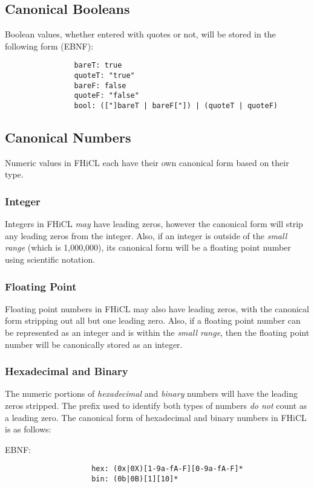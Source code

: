 \documentclass{memarticle}
\begin{document}
{		\subsection{Canonical Booleans}
			Boolean values, whether entered with quotes or not,
			will be stored in the following form (EBNF):
			\begin{verbatim}
				bareT: true
				quoteT: "true"
				bareF: false
				quoteF: "false"
				bool: (["]bareT | bareF["]) | (quoteT | quoteF)
			\end{verbatim}
		\subsection{Canonical Numbers}
			Numeric values in FHiCL each have their own canonical form based on their type.
			\subsubsection{Integer}
				Integers in FHiCL \emph{may} have leading zeros,
				however the canonical form will strip any leading zeros from the integer.
				Also, if an integer is outside of the \emph{small range} (which is 1,000,000),
				its canonical form will be a floating point number using scientific notation.

			\subsubsection{Floating Point}
				Floating point numbers in FHiCL may also have leading zeros,
				with the canonical form stripping out all but one leading zero.
				Also, if a floating point number can be represented as an integer
				and is within the \emph{small range}, 
				then the floating point number will be canonically stored as an integer.

			\subsubsection{Hexadecimal and Binary}
				The numeric portions of \emph{hexadecimal} and \emph{binary} numbers will have the leading zeros stripped.
				The prefix used to identify both types of numbers \emph{do not} count as a leading zero.
				The canonical form of hexadecimal and binary numbers in FHiCL is as follows:
				\par
				EBNF:
				\begin{verbatim}
					hex: (0x|0X)[1-9a-fA-F][0-9a-fA-F]*
					bin: (0b|0B)[1][10]*
				\end{verbatim}
}
\end{document}
